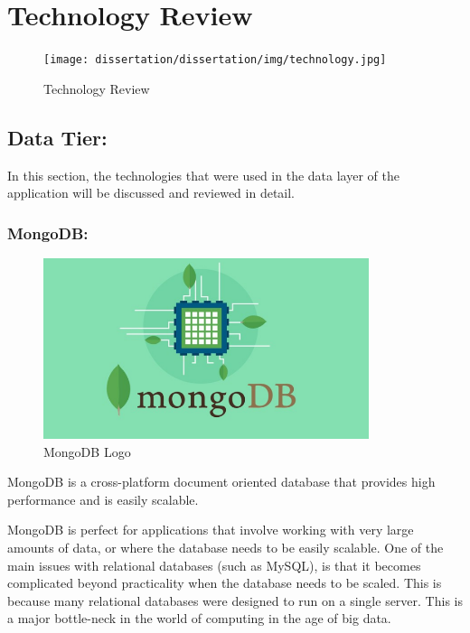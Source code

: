 \chapter{Technology Review}
\label{sec:TechnologyReview}

\bigskip
\begin{figure}[H]
    \centering
    \texttt{[image: dissertation/dissertation/img/technology.jpg]}
    \caption{Technology Review}
    \label{fig:my_label}
\end{figure}

\bigskip


\section{Data Tier:}
\label{sec:TechnologyReviewDataTier}

In this section, the technologies that were used in the data layer of the application will be discussed and reviewed in detail. 


\subsection{MongoDB:}
\label{sec:TechnologyReviewMongoDB}

\begin{figure}[H]
    \centering
    \includegraphics[width=\textwidth, height=150pt]{img/MongoDBLogo.PNG}
    \caption{MongoDB Logo}
    \label{fig:my_label}
\end{figure}

\bigskip


MongoDB is a cross-platform document oriented database that provides high performance and is easily scalable. 

MongoDB is perfect for applications that involve working with very large amounts of data\cite{moniruzzaman2013nosql}, or where the database needs to be easily scalable. One of the main issues with relational databases (such as MySQL), is that it becomes complicated beyond practicality when the database needs to be scaled. This is because many relational databases were designed to run on a single server. This is a major bottle-neck in the world of computing in the age of big data. 

